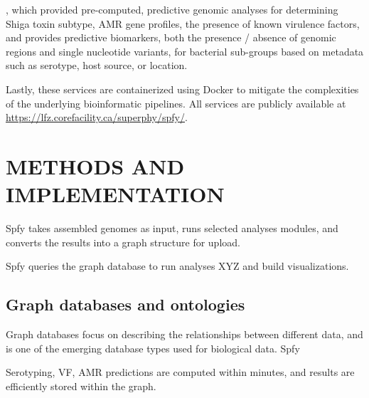 \documentclass[a4,center,fleqn]{NAR}
\begin{document}
, which provided pre-computed, predictive genomic analyses for determining Shiga toxin subtype, AMR gene profiles, the presence of known virulence factors, and provides predictive biomarkers, both the presence / absence of genomic regions and single nucleotide variants, for bacterial sub-groups based on metadata such as serotype, host source, or location.




Lastly, these services are containerized using Docker to mitigate the complexities of the underlying bioinformatic pipelines.
All services are publicly available at \url{https://lfz.corefacility.ca/superphy/spfy/}.

\enlargethispage{-65.1pt}

\section{METHODS AND IMPLEMENTATION}

Spfy takes assembled genomes as input, runs selected analyses modules, and converts the results into a graph structure for upload.

Spfy queries the graph database to run analyses XYZ and build visualizations.

\subsection{Graph databases and ontologies}

Graph databases focus on describing the relationships between different data, and is one of the emerging \cite{de2015trends} database types used for biological data.
Spfy 


Serotyping, VF, AMR predictions are computed within minutes, and results are efficiently stored within the graph.
\end{document}
